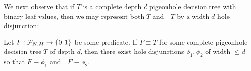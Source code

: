 
We next observe that if $T$ is a complete depth $d$ pigeonhole decision tree with binary leaf values, then we may represent both $T$ and $\lnot T$ by a width $d$ hole disjunction:
\begin{observation}\label{obs:dt-to-disj}
Let $F: \mathcal{F}_{N,M} \to \{0,1\}$ be some predicate. If $F \equiv T$ for some complete pigeonhole decision tree $T$ of depth $d$, then there exist hole disjunctions $\phi_1,\phi_2$ of width $\leq d$ so that $F \equiv \phi_1$ and $\lnot F \equiv \phi_2$.
\end{observation}

